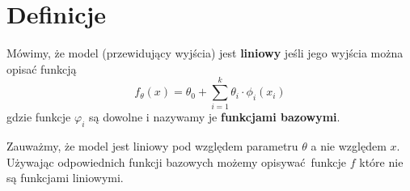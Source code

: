 \section{Definicje}

\begin{definition}
	Mówimy, że model (przewidujący wyjścia) jest \textbf{liniowy} jeśli jego wyjścia można opisać funkcją
	\[
		f_\theta(x) = \theta_0 + \sum_{i=1}^k \theta_i \cdot \phi_i(x_i)
	\]
	gdzie funkcje \( \varphi_i \) są dowolne i nazywamy je \textbf{funkcjami bazowymi}.
\end{definition}

Zauważmy, że model jest liniowy pod względem parametru \( \theta \) a nie względem \( x \). Używając odpowiednich funkcji bazowych możemy opisywać funkcje \( f \) które nie są funkcjami liniowymi.